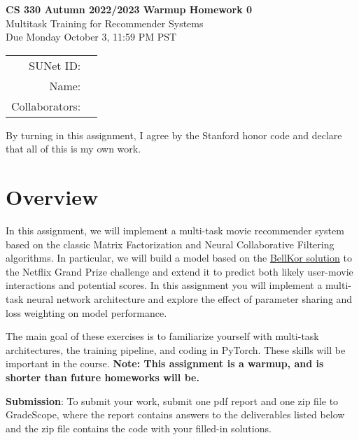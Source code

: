 \documentclass[12pt]{article}
\begin{document}
\begin{center}
{\Large \textbf{CS 330 Autumn 2022/2023 Warmup Homework 0} \\ Multitask Training for Recommender Systems
\\ Due Monday October 3, 11:59 PM PST}
\vspace{0.2cm}

\begin{tabular}{rl}
SUNet ID: &  \\
Name: & \\
Collaborators: & 
\end{tabular}
\end{center}

By turning in this assignment, I agree by the Stanford honor code and declare
that all of this is my own work.



\section{Overview}
In this assignment, we will implement a multi-task movie recommender system based on the classic Matrix Factorization \cite{Yehuda2009matrix} and Neural Collaborative Filtering ~\cite{he2017neural} algorithms. In particular, we will build a model based on the \href{https://www2.seas.gwu.edu/~simhaweb/champalg/cf/papers/KorenBellKor2009.pdf}{BellKor solution} to the Netflix Grand Prize challenge and extend it to predict both likely user-movie interactions and potential scores. In this assignment you will implement a multi-task neural network architecture and explore the effect of parameter sharing and loss weighting on model performance.

\vspace{0.2cm}
\noindent The main goal of these exercises is to familiarize yourself with multi-task architectures, the training pipeline, and coding in PyTorch. These skills will be important in the course. \textbf{Note: This assignment is a warmup, and is shorter than future homeworks will be.}

\vspace{0.2cm}

\noindent\textbf{Submission}: To submit your work, submit one pdf report and one zip file to GradeScope, where the report contains answers to the deliverables listed below and the zip file contains the code with your filled-in solutions. 
\end{document}
